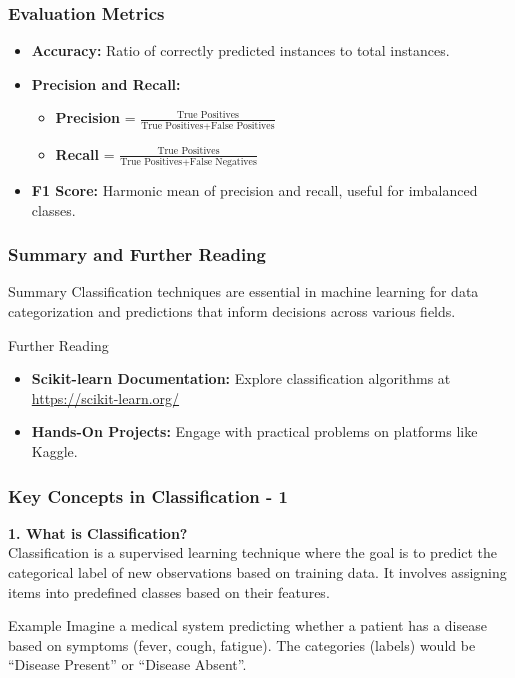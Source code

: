 \documentclass[aspectratio=169]{beamer}
\begin{document}
\begin{frame}[fragile]
    \frametitle{Evaluation Metrics}
    \begin{itemize}
        \item \textbf{Accuracy:} Ratio of correctly predicted instances to total instances.
        \item \textbf{Precision and Recall:}
            \begin{itemize}
                \item \textbf{Precision} = $\frac{\text{True Positives}}{\text{True Positives} + \text{False Positives}}$
                \item \textbf{Recall} = $\frac{\text{True Positives}}{\text{True Positives} + \text{False Negatives}}$
            \end{itemize}
        \item \textbf{F1 Score:} Harmonic mean of precision and recall, useful for imbalanced classes.
    \end{itemize}
\end{frame}

\begin{frame}[fragile]
    \frametitle{Summary and Further Reading}
    \begin{block}{Summary}
        Classification techniques are essential in machine learning for data categorization and predictions that inform decisions across various fields.
    \end{block}
    \begin{block}{Further Reading}
        \begin{itemize}
            \item \textbf{Scikit-learn Documentation:} Explore classification algorithms at \url{https://scikit-learn.org/}
            \item \textbf{Hands-On Projects:} Engage with practical problems on platforms like Kaggle.
        \end{itemize}
    \end{block}
\end{frame}

\begin{frame}[fragile]
    \frametitle{Key Concepts in Classification - 1}
    \textbf{1. What is Classification?} \\
    Classification is a supervised learning technique where the goal is to predict the categorical label of new observations based on training data. It involves assigning items into predefined classes based on their features.

    \begin{block}{Example}
        Imagine a medical system predicting whether a patient has a disease based on symptoms (fever, cough, fatigue). The categories (labels) would be “Disease Present” or “Disease Absent”.
    \end{block}
\end{frame}
\end{document}
